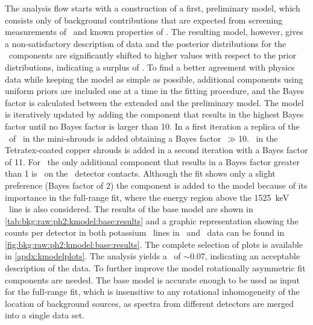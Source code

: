The analysis flow starts with a construction of a first, preliminary model, which consists
only of background contributions that are expected from screening measurements of \kvn\
and known properties of \kvz.  The resulting model, however, gives a non-satisfactory
description of data and the posterior distributions for the \kvn\ components are
significantly shifted to higher values with respect to the prior distributions, indicating
a surplus of \kvn.  To find a better agreement with physics data while keeping the model
as simple as possible, additional components using uniform priors are included one at a
time in the fitting procedure, and the Bayes factor is calculated between the extended and
the preliminary model. The model is iteratively updated by adding the component that
results in the highest Bayes factor until no Bayes factor is larger than 10.
\newpar
In a first iteration a replica of the \pdf\ of \kvn\ in the mini-shrouds is added obtaining
a Bayes factor~$\gg$10. \kvn\ in the Tetratex\reg-coated copper shrouds is added in a
second iteration with a Bayes factor of 11.  For \kvz\ the only additional component that
results in a Bayes factor greater than 1 is \kvz\ on the \nplus\ detector contacts.
Although the fit shows only a slight preference (Bayes factor of 2) the component is added
to the model because of its importance in the full-range fit, where the energy region
above the 1525~keV \g\ line is also considered.  The results of the base model are shown
in \cref{tab:bkg:raw:ph2:kmodel:base:results} and a graphic representation showing the
counts per detector in both potassium \g\ lines in \Mone\ and \Mtwo\ data can be found in
\cref{fig:bkg:raw:ph2:kmodel:base:results}. The complete selection of plots is available
in \cref{apdx:kmodelplots}.  The analysis yields a \pvalue\ of $\sim$0.07, indicating an
acceptable description of the data. To further improve the model rotationally asymmetric
fit components are needed. The base model is accurate enough to be used as input for the
full-range fit, which is insensitive to any rotational inhomogeneity of the location of
background sources, as spectra from different detectors are merged into a single data set.

